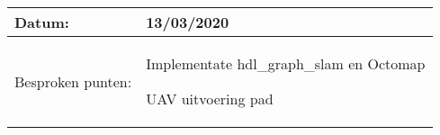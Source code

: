 \begin{tabularx}{\textwidth}{| l | X |}
  \hline
  Datum: & 13/03/2020\\
  \hline
  Besproken punten: &
  \begin{compactitem}
    \item Implementate hdl\_graph\_slam en Octomap
    \item UAV uitvoering pad
  \end{compactitem}\\
  \hline
\end{tabularx}